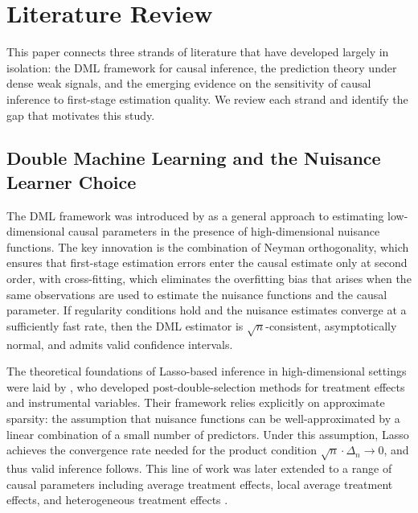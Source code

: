 \documentclass[a4paper,10.5pt]{article}
\begin{document}
\section{Literature Review}\label{sec:literature}

This paper connects three strands of literature that have developed largely in isolation: the DML framework for causal inference, the prediction theory under dense weak signals, and the emerging evidence on the sensitivity of causal inference to first-stage estimation quality. We review each strand and identify the gap that motivates this study.


\subsection{Double Machine Learning and the Nuisance Learner Choice}\label{sec:lit_dml}

The DML framework was introduced by \citet{chernozhukov2018} as a general approach to estimating low-dimensional causal parameters in the presence of high-dimensional nuisance functions. The key innovation is the combination of Neyman orthogonality, which ensures that first-stage estimation errors enter the causal estimate only at second order, with cross-fitting, which eliminates the overfitting bias that arises when the same observations are used to estimate the nuisance functions and the causal parameter. If regularity conditions hold and the nuisance estimates converge at a sufficiently fast rate, then the DML estimator is $\sqrt{n}$-consistent, asymptotically normal, and admits valid confidence intervals.

The theoretical foundations of Lasso-based inference in high-dimensional settings were laid by \citet{belloni2014}, who developed post-double-selection methods for treatment effects and instrumental variables. Their framework relies explicitly on approximate sparsity: the assumption that nuisance functions can be well-approximated by a linear combination of a small number of predictors. Under this assumption, Lasso achieves the convergence rate needed for the product condition $\sqrt{n}\cdot\Delta_n \to 0$, and thus valid inference follows. This line of work was later extended to a range of causal parameters including average treatment effects, local average treatment effects, and heterogeneous treatment effects \citep{belloni2014, semenova2021}.
\end{document}
